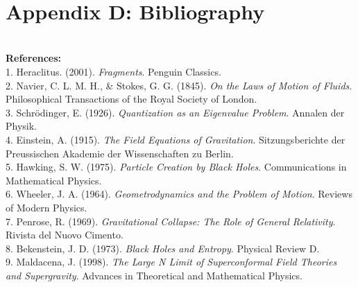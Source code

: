\documentclass{article}
\begin{document}
\\

\

\

\

\

\

\

\


\section*{Appendix D: Bibliography}
\\

\textbf{References:}
\\

1. Heraclitus. (2001). \textit{Fragments}. Penguin Classics.
\\

2. Navier, C. L. M. H., & Stokes, G. G. (1845). \textit{On the Laws of Motion of Fluids}. Philosophical Transactions of the Royal Society of London.
\\

3. Schrödinger, E. (1926). \textit{Quantization as an Eigenvalue Problem}. Annalen der Physik.
\\

4. Einstein, A. (1915). \textit{The Field Equations of Gravitation}. Sitzungsberichte der Preussischen Akademie der Wissenschaften zu Berlin.
\\

5. Hawking, S. W. (1975). \textit{Particle Creation by Black Holes}. Communications in Mathematical Physics.
\\

6. Wheeler, J. A. (1964). \textit{Geometrodynamics and the Problem of Motion}. Reviews of Modern Physics.
\\

7. Penrose, R. (1969). \textit{Gravitational Collapse: The Role of General Relativity}. Rivista del Nuovo Cimento.
\\

8. Bekenstein, J. D. (1973). \textit{Black Holes and Entropy}. Physical Review D.
\\

9. Maldacena, J. (1998). \textit{The Large N Limit of Superconformal Field Theories and Supergravity}. Advances in Theoretical and Mathematical Physics.
\\
\end{document}

